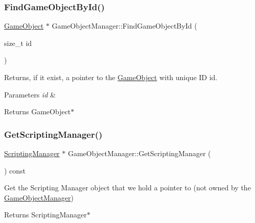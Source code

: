 \subsubsection{\texorpdfstring{Find\+Game\+Object\+By\+Id()}{FindGameObjectById()}}
{\footnotesize\ttfamily \hyperlink{classGameObject}{Game\+Object} $\ast$ Game\+Object\+Manager\+::\+Find\+Game\+Object\+By\+Id (\begin{DoxyParamCaption}\item[{size\+\_\+t}]{id }\end{DoxyParamCaption})}



Returns, if it exist, a pointer to the \hyperlink{classGameObject}{Game\+Object} with unique ID id. 


\begin{DoxyParams}{Parameters}
{\em id} & \\
\hline
\end{DoxyParams}
\begin{DoxyReturn}{Returns}
Game\+Object$\ast$ 
\end{DoxyReturn}
\mbox{\label{classGameObjectManager_a28a54b6450a5e24621dd582d6bee3f1a}} 
\subsubsection{\texorpdfstring{Get\+Scripting\+Manager()}{GetScriptingManager()}}
{\footnotesize\ttfamily \hyperlink{classScriptingManager}{Scripting\+Manager} $\ast$ Game\+Object\+Manager\+::\+Get\+Scripting\+Manager (\begin{DoxyParamCaption}{ }\end{DoxyParamCaption}) const}



Get the Scripting Manager object that we hold a pointer to (not owned by the \hyperlink{classGameObjectManager}{Game\+Object\+Manager}) 

\begin{DoxyReturn}{Returns}
Scripting\+Manager$\ast$ 
\end{DoxyReturn}
\mbox{\label{classGameObjectManager_a9456fff658ca2a9c13490a8a5635644c}} 
